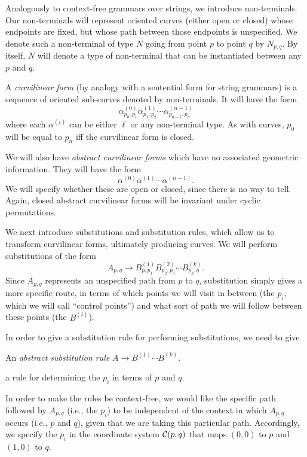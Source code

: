 \documentclass{article}
\begin{document}
Analogously to context-free grammars over strings, we introduce
non-terminals. Our non-terminals will represent oriented curves
(either open or closed) whose endpoints are fixed, but whose path
between those endpoints is unspecified. We denote such a non-terminal
of type $N$ going from point $p$ to point $q$ by $N_{p,q}$. By itself,
$N$ will denote a type of non-terminal that can be instantiated
between any $p$ and $q$.

\begin{defn}
A {\em curvilinear form} (by analogy with a sentential form for string
grammars) is a sequence of oriented sub-curves denoted by
non-terminals. It will have the form
$$ \alpha^{(0)}_{p_0,p_1} \alpha^{(1)}_{p_1,p_2} \cdots
\alpha^{(n-1)}_{p_{n-1},{p_n}}$$ where each $\alpha^{(i)}$ can be
either $\ell$ or any non-terminal type. As with curves, $p_0$ will be
equal to $p_n$ iff the curvilinear form is closed.

We will also have {\em abstract curvilinear forms} which have no
associated geometric information. They will have the form
$$ \alpha^{(0)} \alpha^{(1)} \cdots \alpha^{(n-1)}.$$ We will specify
whether these are open or closed, since there is no way to
tell. Again, closed abstract curvilinear forms will be invariant under
cyclic permutations.
\end{defn}

We next introduce substitutions and substitution rules, which allow us
to transform curvilinear forms, ultimately producing curves. We will
perform substitutions of the form
$$ A_{p,q} \to B^{(1)}_{p,p_1} B^{(2)}_{p_2,p_3} \cdots
B^{(k)}_{p_k,q}.$$ Since $A_{p,q}$ represents an unspecified path from
$p$ to $q$, substitution simply gives a more specific route, in terms
of which points we will visit in between (the $p_i$, which we will
call ``control points'') and what sort of path we will follow between
these points (the $B^{(i)}$).

In order to give a substitution rule for performing substitutions, we
need to give
\bitem
\item An {\em abstract substitution rule} $A\to B^{(1)}\cdots B^{(k)}$.
\item a rule for determining the $p_i$ in terms of $p$ and $q$.
  \eitem

In order to make the rules be context-free, we would like the specific
path followed by $A_{p,q}$ (i.e., the $p_i$) to be independent of the
context in which $A_{p,q}$ occurs (i.e., $p$ and $q$), given that we
are taking this particular path. Accordingly, we specify the $p_i$ in
the coordinate system ${\mathcal C}(p,q)$ that maps $(0,0)$ to $p$ and $(1,0)$
to $q$.
\end{document}
